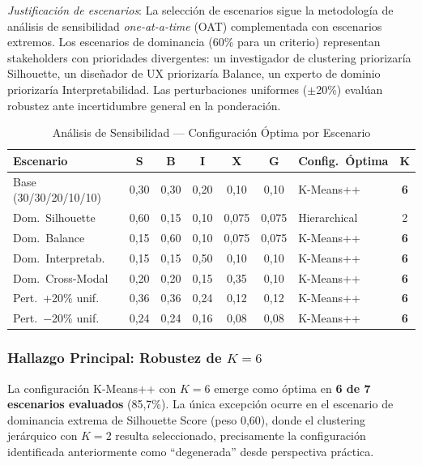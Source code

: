 \textit{Justificación de escenarios}: La selección de escenarios sigue la metodología de análisis de sensibilidad \textit{one-at-a-time} (OAT) complementada con escenarios extremos. Los escenarios de dominancia (60\% para un criterio) representan stakeholders con prioridades divergentes: un investigador de clustering priorizaría Silhouette, un diseñador de UX priorizaría Balance, un experto de dominio priorizaría Interpretabilidad. Las perturbaciones uniformes ($\pm$20\%) evalúan robustez ante incertidumbre general en la ponderación.

\begin{table}[htbp]
\centering
\caption{Análisis de Sensibilidad --- Configuración Óptima por Escenario}
\label{tab:sensibilidad}
\small
\begin{tabular}{lccccclc}
\toprule
\textbf{Escenario} & \textbf{S} & \textbf{B} & \textbf{I} & \textbf{X} & \textbf{G} & \textbf{Config.\ Óptima} & \textbf{K} \\
\midrule
Base (30/30/20/10/10) & 0,30 & 0,30 & 0,20 & 0,10 & 0,10 & K-Means++ & \textbf{6} \\
Dom.\ Silhouette & 0,60 & 0,15 & 0,10 & 0,075 & 0,075 & Hierarchical & 2 \\
Dom.\ Balance & 0,15 & 0,60 & 0,10 & 0,075 & 0,075 & K-Means++ & \textbf{6} \\
Dom.\ Interpretab. & 0,15 & 0,15 & 0,50 & 0,10 & 0,10 & K-Means++ & \textbf{6} \\
Dom.\ Cross-Modal & 0,20 & 0,20 & 0,15 & 0,35 & 0,10 & K-Means++ & \textbf{6} \\
Pert.\ +20\% unif. & 0,36 & 0,36 & 0,24 & 0,12 & 0,12 & K-Means++ & \textbf{6} \\
Pert.\ $-$20\% unif. & 0,24 & 0,24 & 0,16 & 0,08 & 0,08 & K-Means++ & \textbf{6} \\
\bottomrule
\end{tabular}
\end{table}

\subsubsection{Hallazgo Principal: Robustez de $K=6$}

La configuración K-Means++ con $K=6$ emerge como óptima en \textbf{6 de 7 escenarios evaluados} (85,7\%). La única excepción ocurre en el escenario de dominancia extrema de Silhouette Score (peso 0,60), donde el clustering jerárquico con $K=2$ resulta seleccionado, precisamente la configuración identificada anteriormente como ``degenerada'' desde perspectiva práctica.

